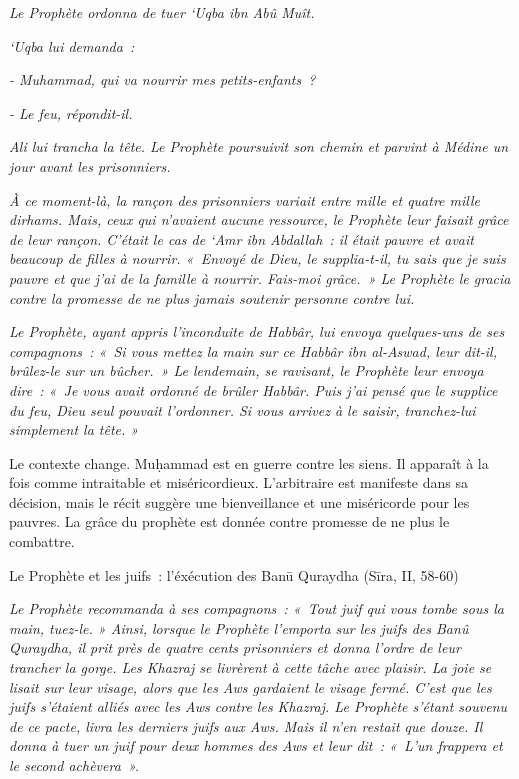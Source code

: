 \emph{Le Prophète ordonna de tuer `Uqba ibn Abû Muît.}

\emph{`Uqba lui demanda~:}

\emph{- Muhammad, qui va nourrir mes petits-enfants~?}

\emph{- Le feu, répondit-il.}

\emph{Ali lui trancha la tête. Le Prophète poursuivit son chemin et
parvint à Médine un jour avant les prisonniers.}

\emph{À ce moment-là, la rançon des prisonniers variait entre mille et
quatre mille dirhams. Mais, ceux qui n'avaient aucune ressource, le
Prophète leur faisait grâce de leur rançon. C'était le cas de `Amr ibn
Abdallah~: il était pauvre et avait beaucoup de filles à nourrir.
«~Envoyé de Dieu, le supplia-t-il, tu sais que je suis pauvre et que
j'ai de la famille à nourrir. Fais-moi grâce.~» Le Prophète le gracia
contre la promesse de ne plus jamais soutenir personne contre lui.}

\emph{Le Prophète, ayant appris l'inconduite de Habbâr, lui envoya
quelques-uns de ses compagnons~: «~Si vous mettez la main sur ce Habbâr
ibn al-Aswad, leur dit-il, brûlez-le sur un bûcher.~» Le lendemain, se
ravisant, le Prophète leur envoya dire~: «~Je vous avait ordonné de
brûler Habbâr. Puis j'ai pensé que le supplice du feu, Dieu seul pouvait
l'ordonner. Si vous arrivez à le saisir, tranchez-lui simplement la
tête. »}

Le contexte change. Muḥammad est en guerre contre les siens. Il apparaît
à la fois comme intraitable et miséricordieux. L'arbitraire est
manifeste dans sa décision, mais le récit suggère une bienveillance et
une miséricorde pour les pauvres. La grâce du prophète est donnée contre
promesse de ne plus le combattre.


Le Prophète et les juifs~: l'éxécution des Banū Quraydha (Sīra, II,
58-60)

\emph{Le Prophète recommanda à ses compagnons~: «~Tout juif qui vous
tombe sous la main, tuez-le. » Ainsi, lorsque le Prophète l'emporta sur
les juifs des Banû Quraydha, il prit près de quatre cents prisonniers et
donna l'ordre de leur trancher la gorge. Les Khazraj se livrèrent à
cette tâche avec plaisir. La joie se lisait sur leur visage, alors que
les Aws gardaient le visage fermé. C'est que les juifs s'étaient alliés
avec les Aws contre les Khazraj. Le Prophète s'étant souvenu de ce
pacte, livra les derniers juifs aux Aws. Mais il n'en restait que douze.
Il donna à tuer un juif pour deux hommes des Aws et leur dit~: «~L'un
frappera et le second achèvera~».}

